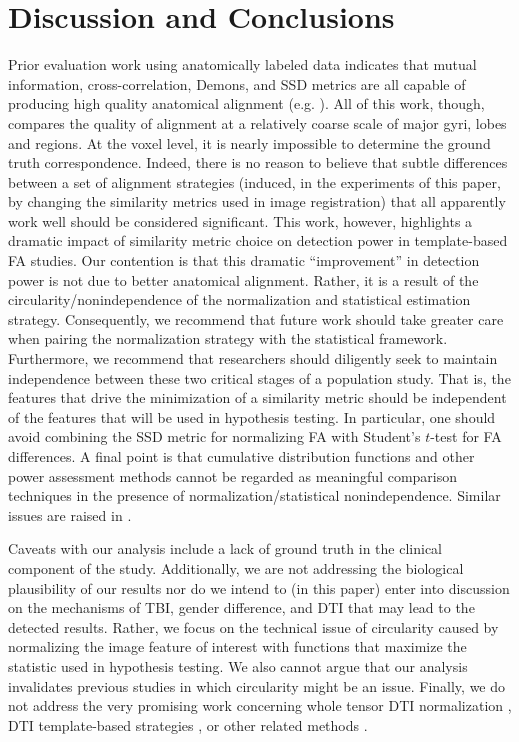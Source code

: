 \documentclass[final,5p,times,twocolumn]{elsarticle}
\begin{document}
\section{Discussion and Conclusions} 
Prior evaluation work using anatomically labeled
data indicates that mutual information, cross-correlation, Demons, and
SSD metrics are all capable of producing high quality anatomical
alignment (e.g. \citep{Klein2009}).  All of this work, though, compares
the quality of alignment at a relatively coarse scale of major gyri,
lobes and regions.  At the voxel level, it is nearly impossible to
determine the ground truth correspondence.  Indeed, there is no reason
to believe that subtle differences between a set of alignment
strategies (induced, in the experiments of this paper, by changing the
similarity metrics used in image registration) that all apparently
work well should be considered significant.  This work, however,
highlights a dramatic impact of similarity metric choice on detection
power in template-based FA studies.  Our contention is that this
dramatic ``improvement'' in detection power is not due to better
anatomical alignment.  Rather, it is a result of the
circularity/nonindependence of the normalization and statistical
estimation strategy.  Consequently, we recommend that future work
should take greater care when pairing the normalization strategy with
the statistical framework.  Furthermore, we recommend that researchers
should diligently seek to maintain independence between these two
critical stages of a population study.  That is, the features that
drive the minimization of a similarity metric should be independent of
the features that will be used in hypothesis testing.  In particular,
one should avoid combining the SSD metric for normalizing FA with
Student's $t$-test for FA differences.  A final point is that
cumulative distribution functions and other power assessment methods
cannot be regarded as meaningful comparison techniques in the presence
of normalization/statistical nonindependence.  Similar issues are
raised in \cite{Kriegeskorte2010}.

Caveats with our analysis include a lack of ground truth in the
clinical component of the study.   Additionally, we are not addressing
the biological plausibility of our results nor do we
intend to (in this paper) enter into discussion on the mechanisms of
TBI, gender difference, and DTI that may lead to the detected results.
Rather, we focus on the technical issue of circularity caused by
normalizing the image feature of interest with functions that maximize
the statistic used in hypothesis testing.  We also cannot argue that our analysis
invalidates previous studies in which circularity might be an issue.  
Finally, we do not address the very promising work concerning
whole tensor DTI normalization \citep{Zhang2007,Hecke2007}, DTI template-based
strategies \citep{Mori2009,Hecke2011}, or other related methods \cite{jbabdi2010}.  
\end{document}
